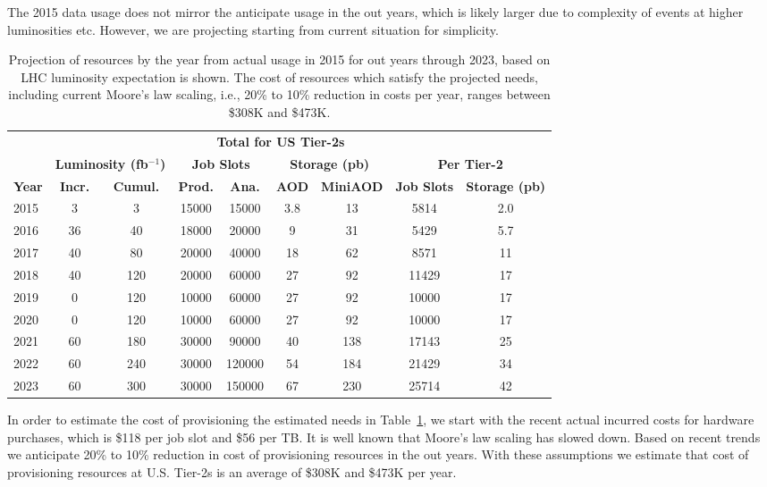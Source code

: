 \documentclass[11pt,a4paper]{article}
\begin{document}
The 2015 data usage does not mirror the anticipate usage in the out years,
which is likely larger due to complexity of events at higher luminosities
etc.  However, we are projecting starting from current situation for
simplicity.

\begin{table}
\begin{center}
\begin{tabular}{|l|c|c|c|c|c|c|c|c|}
\hline
&\multicolumn{2}{|c|}{ } &\multicolumn{4}{|c|}{\bf Total for US Tier-2s}&\multicolumn{2}{|c|}{ } \\ \cline{4-7}
&\multicolumn{2}{|c|}{\bf Luminosity (fb$^{-1}$)}&\multicolumn{2}{|c|}{\bf Job Slots}&\multicolumn{2}{|c|}{\bf Storage (pb)}&\multicolumn{2}{|c|}{\bf Per Tier-2} \\ \cline{2-9}
{\bf Year}&{\bf Incr.}&{\bf Cumul.}&{\bf Prod.}&{\bf Ana.}&{\bf AOD}&{\bf MiniAOD}&{\bf Job Slots}&{\bf Storage (pb)} \\  \hline
2015&    3&   3& 15000&   15000& 3.8&  13&   5814&   2.0 \\ \hline
2016&   36&  40& 18000&   20000&   9&  31&   5429&   5.7 \\ \hline
2017&   40&  80& 20000&   40000&  18&  62&   8571&    11 \\ \hline
2018&   40& 120& 20000&   60000&  27&  92&  11429&    17 \\ \hline
2019&    0& 120& 10000&   60000&  27&  92&  10000&    17 \\ \hline
2020&    0& 120& 10000&   60000&  27&  92&  10000&    17 \\ \hline
2021&   60& 180& 30000&   90000&  40& 138&  17143&    25 \\ \hline
2022&   60& 240& 30000&  120000&  54& 184&  21429&    34 \\ \hline
2023&   60& 300& 30000&  150000&  67& 230&  25714&    42 \\ \hline
\end{tabular}
\caption[]
{
Projection of resources by the year from actual usage in 2015 for
out years through 2023, based on LHC luminosity expectation is
shown. The cost of resources which satisfy the projected needs, 
including current Moore's law scaling, i.e., 20\% to 10\% reduction 
in costs per year, ranges between \$308K and \$473K.
}
\label{projection}
\end{center}
\end{table}

In order to estimate the cost of provisioning the estimated needs in
Table~\ref{projection}, we start with the recent actual incurred costs 
for hardware purchases, which is \$118 per job slot and \$56 per TB.
It is well known that Moore's law scaling has slowed down.  Based
on recent trends we anticipate 20\% to 10\% reduction in cost of
provisioning resources in the out years.  With these assumptions
we estimate that cost of provisioning resources at U.S. Tier-2s
is an average of \$308K and \$473K per year. 
\end{document}
